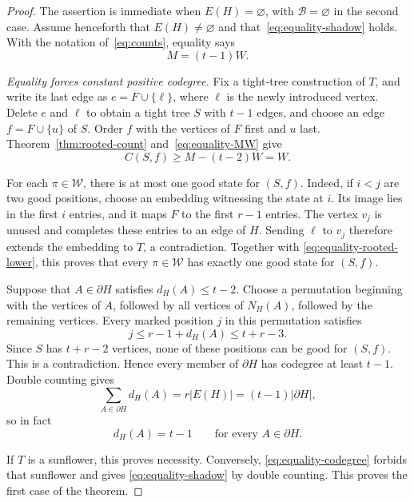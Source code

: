 \documentclass[11pt]{article}
\theoremstyle{remark}
\numberwithin{equation}{section}
\newcommand{\sh}{\partial}
\newcommand{\Wcal}{\mathcal W}
\begin{document}
	\begin{proof}
		The assertion is immediate when $E(H)=\varnothing$, with
		$\mathcal B=\varnothing$ in the second case. Assume henceforth
		that $E(H)\ne\varnothing$ and that~\eqref{eq:equality-shadow}
		holds. With the notation of~\eqref{eq:counts}, equality says
		\begin{equation}\label{eq:equality-MW}
			M=(t-1)W.
		\end{equation}
		
		\medskip\noindent
		\emph{Equality forces constant positive codegree.}
		Fix a tight-tree construction of $T$, and write its last edge as
		$e=F\cup\{\ell\}$, where $\ell$ is the newly introduced vertex.
		Delete $e$ and $\ell$ to obtain a tight tree $S$ with $t-1$ edges,
		and choose an edge $f=F\cup\{u\}$ of $S$. Order $f$ with the
		vertices of $F$ first and $u$ last. Theorem~\ref{thm:rooted-count}
		and~\eqref{eq:equality-MW} give
		\begin{equation}\label{eq:equality-rooted-lower}
			C(S,f)\ge M-(t-2)W=W.
		\end{equation}
		
		For each $\pi\in\Wcal$, there is at most one good state for
		$(S,f)$. Indeed, if $i<j$ are two good positions, choose an
		embedding witnessing the state at $i$. Its image lies in the
		first $i$ entries, and it maps $F$ to the first $r-1$ entries.
		The vertex $v_j$ is unused and completes these entries to an
		edge of $H$. Sending $\ell$ to $v_j$ therefore extends the
		embedding to $T$, a contradiction. Together with
		\eqref{eq:equality-rooted-lower}, this proves that every
		$\pi\in\Wcal$ has exactly one good state for $(S,f)$.
		
		\bigskip
		
		Suppose that $A\in\sh H$ satisfies $d_H(A)\le t-2$. Choose
		a permutation beginning with the vertices of $A$, followed by
		all vertices of $N_H(A)$, followed by the remaining vertices.
		Every marked position $j$ in this permutation satisfies
		\[
		j\le r-1+d_H(A)\le t+r-3.
		\]
		Since $S$ has $t+r-2$ vertices, none of these positions can be
		good for $(S,f)$. This is a contradiction. Hence every member
		of $\sh H$ has codegree at least $t-1$. Double counting gives
		\[
		\sum_{A\in\sh H}d_H(A)=r|E(H)|=(t-1)|\sh H|,
		\]
		so in fact
		\begin{equation}\label{eq:equality-codegree}
			d_H(A)=t-1\qquad\text{for every }A\in\sh H.
		\end{equation}
		
		If $T$ is a sunflower, this proves necessity. Conversely,
		\eqref{eq:equality-codegree} forbids that sunflower and gives
		\eqref{eq:equality-shadow} by double counting. This proves
		the first case of the theorem.
		

\end{proof}
\end{document}

